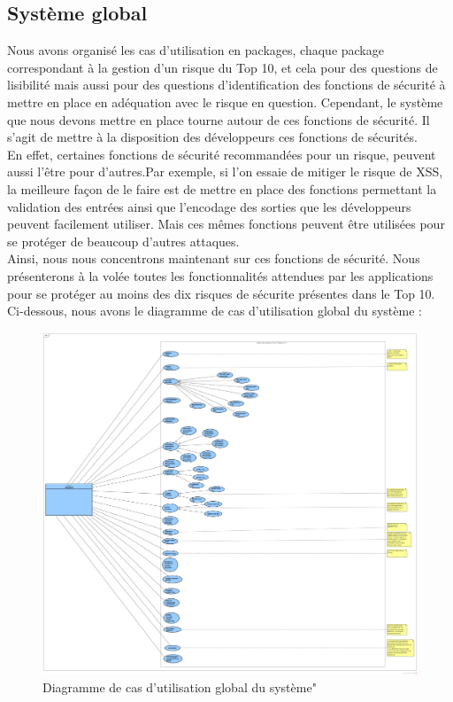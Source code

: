 \subsection{Système global}
Nous avons organisé les cas d'utilisation en packages, chaque package correspondant à la gestion d'un risque du Top 10, et cela pour des questions de lisibilité mais aussi pour des questions d'identification des fonctions de sécurité à mettre en place en adéquation avec le risque en question. Cependant, le système que nous devons mettre en place tourne autour de ces fonctions de sécurité. Il s'agit de mettre à la disposition des développeurs ces fonctions de sécurités. \\
En effet, certaines fonctions de sécurité recommandées pour un risque, peuvent aussi l'être pour d'autres.Par exemple, si l'on essaie de mitiger le risque de XSS, la meilleure façon de le faire est de mettre en place des fonctions permettant la validation des entrées ainsi que l'encodage des sorties que les développeurs peuvent facilement utiliser. Mais ces mêmes fonctions peuvent être utilisées pour se protéger de beaucoup  d’autres attaques. \\
Ainsi, nous nous concentrons maintenant sur ces fonctions de sécurité. Nous présenterons à la volée toutes les fonctionnalités attendues par les applications pour se protéger au moins des dix risques de sécurite présentes dans le Top 10.\\
Ci-dessous, nous avons le diagramme de cas d'utilisation global du système :
\begin{figure}[H]
	\centering
	\includegraphics[width=1.0\textwidth,height=0.95\textheight]{fig/Global-use-case-diagram.png}
	\caption{Diagramme de cas d'utilisation global du système"}
	\label{fig:7.12}
\end{figure}
